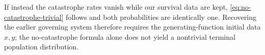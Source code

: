 If instead the catastrophe rates vanish while our survival data are kept, \cref{eq:no-catastrophe-trivial} follows and both probabilities are identically one. Recovering the earlier governing system therefore requires the generating-function initial data $x,y$; the no-catastrophe formula alone does not yield a nontrivial terminal population distribution.


\endgroup
\restoretoc
